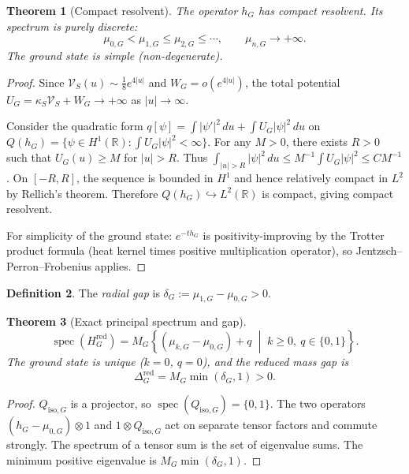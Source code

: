 \documentclass[12pt]{article}
\theoremstyle{plain}
\newtheorem{theorem}{Theorem}[section]
\theoremstyle{definition}
\newtheorem{definition}[theorem]{Definition}
\numberwithin{equation}{section}
\newcommand{\R}{\mathbb{R}}
\newcommand{\spec}{\operatorname{spec}}
\newcommand{\red}{\mathrm{red}}
\newcommand{\iso}{\mathrm{iso}}
\begin{document}
\begin{theorem}[Compact resolvent]\label{thm:compactresolvent}
The operator $h_G$ has compact resolvent.  Its spectrum is purely discrete:
\begin{equation}
\mu_{0,G} < \mu_{1,G} \leq \mu_{2,G} \leq \cdots,\qquad \mu_{n,G}\to+\infty.
\end{equation}
The ground state is simple (non-degenerate).
\end{theorem}

\begin{proof}
Since $\mathcal{V}_S(u)\sim\frac{1}{8}e^{4|u|}$ and $W_G=o(e^{4|u|})$, the total potential $U_G=\kappa_S\mathcal{V}_S+W_G\to+\infty$ as $|u|\to\infty$.

Consider the quadratic form $q[\psi]=\int|\psi'|^2\,du+\int U_G|\psi|^2\,du$ on $Q(h_G)=\{\psi\in H^1(\R):\int U_G|\psi|^2<\infty\}$.  For any $M>0$, there exists $R>0$ such that $U_G(u)\geq M$ for $|u|>R$.  Thus $\int_{|u|>R}|\psi|^2\,du\leq M^{-1}\int U_G|\psi|^2\leq CM^{-1}$.  On $[-R,R]$, the sequence is bounded in $H^1$ and hence relatively compact in $L^2$ by Rellich's theorem.  Therefore $Q(h_G)\hookrightarrow L^2(\R)$ is compact, giving compact resolvent.

For simplicity of the ground state: $e^{-th_G}$ is positivity-improving by the Trotter product formula (heat kernel times positive multiplication operator), so Jentzsch--Perron--Frobenius applies.
\end{proof}

\begin{definition}
The \emph{radial gap} is $\delta_G := \mu_{1,G}-\mu_{0,G}>0$.
\end{definition}

\begin{theorem}[Exact principal spectrum and gap]\label{thm:exactspectrum}
\begin{equation}
\spec(H_G^{\red}) = M_G\left\{(\mu_{k,G}-\mu_{0,G})+q \;\middle|\; k\geq 0,\ q\in\{0,1\}\right\}.
\end{equation}
The ground state is unique ($k=0$, $q=0$), and the reduced mass gap is
\begin{equation}
\boxed{\Delta_G^{\red} = M_G\min(\delta_G,1) > 0.}
\end{equation}
\end{theorem}

\begin{proof}
$Q_{\iso,G}$ is a projector, so $\spec(Q_{\iso,G})=\{0,1\}$.  The two operators $(h_G-\mu_{0,G})\otimes 1$ and $1\otimes Q_{\iso,G}$ act on separate tensor factors and commute strongly.  The spectrum of a tensor sum is the set of eigenvalue sums.  The minimum positive eigenvalue is $M_G\min(\delta_G,1)$.
\end{proof}
\end{document}
